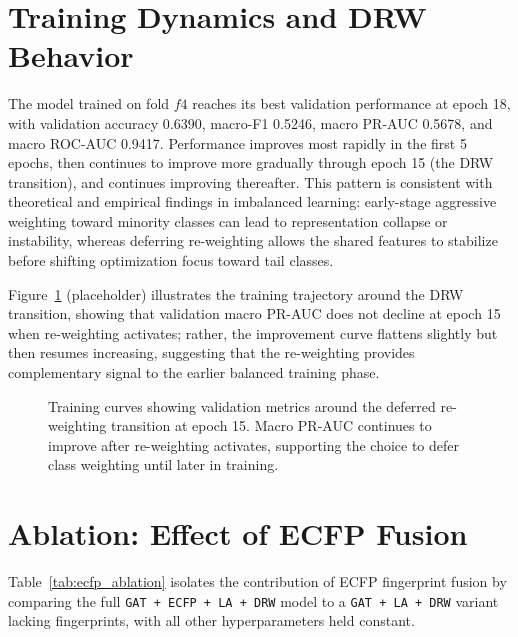 \documentclass[11pt,a4paper]{report}
\begin{document}
\section{Training Dynamics and DRW Behavior}
The model trained on fold \(f4\) reaches its best validation performance at epoch 18, with validation accuracy 0.6390, macro-F1 0.5246, macro PR-AUC 0.5678, and macro ROC-AUC 0.9417. Performance improves most rapidly in the first 5 epochs, then continues to improve more gradually through epoch 15 (the DRW transition), and continues improving thereafter. This pattern is consistent with theoretical and empirical findings in imbalanced learning: early-stage aggressive weighting toward minority classes can lead to representation collapse or instability, whereas deferring re-weighting allows the shared features to stabilize before shifting optimization focus toward tail classes.

Figure~\ref{fig:drw_transition} (placeholder) illustrates the training trajectory around the DRW transition, showing that validation macro PR-AUC does not decline at epoch 15 when re-weighting activates; rather, the improvement curve flattens slightly but then resumes increasing, suggesting that the re-weighting provides complementary signal to the earlier balanced training phase.

\begin{figure}[H]
\centering
{}
\caption{Training curves showing validation metrics around the deferred re-weighting transition at epoch 15. Macro PR-AUC continues to improve after re-weighting activates, supporting the choice to defer class weighting until later in training.}
\label{fig:drw_transition}
\end{figure}
\section{Ablation: Effect of ECFP Fusion}
Table~\ref{tab:ecfp_ablation} isolates the contribution of ECFP fingerprint fusion by comparing the full \texttt{GAT + ECFP + LA + DRW} model to a \texttt{GAT + LA + DRW} variant lacking fingerprints, with all other hyperparameters held constant.
\end{document}
